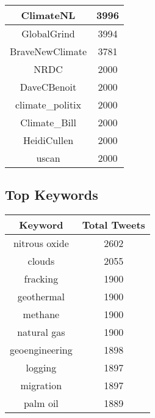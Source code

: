 \documentclass{article}\usepackage[T1]{fontenc}
\begin{document}
\begin{tabular}{|c|c|}
 \hline
ClimateNL & 3996\\ 
 \hline
GlobalGrind & 3994\\ 
 \hline
BraveNewClimate & 3781\\ 
 \hline
NRDC & 2000\\ 
 \hline
DaveCBenoit & 2000\\ 
 \hline
climate\_politix & 2000\\ 
 \hline
Climate\_Bill & 2000\\ 
 \hline
HeidiCullen & 2000\\ 
 \hline
uscan & 2000\\ 
 \hline
\end{tabular}\subsection*{Top Keywords}\begin{tabular}{|c|c|}         \hline         Keyword & Total Tweets \\ 
 \hline
nitrous oxide & 2602\\ 
 \hline
clouds & 2055\\ 
 \hline
fracking & 1900\\ 
 \hline
geothermal & 1900\\ 
 \hline
methane & 1900\\ 
 \hline
natural gas & 1900\\ 
 \hline
geoengineering & 1898\\ 
 \hline
logging & 1897\\ 
 \hline
migration & 1897\\ 
 \hline
palm oil & 1889\\ 
 \hline
\end{tabular}
\end{document}
